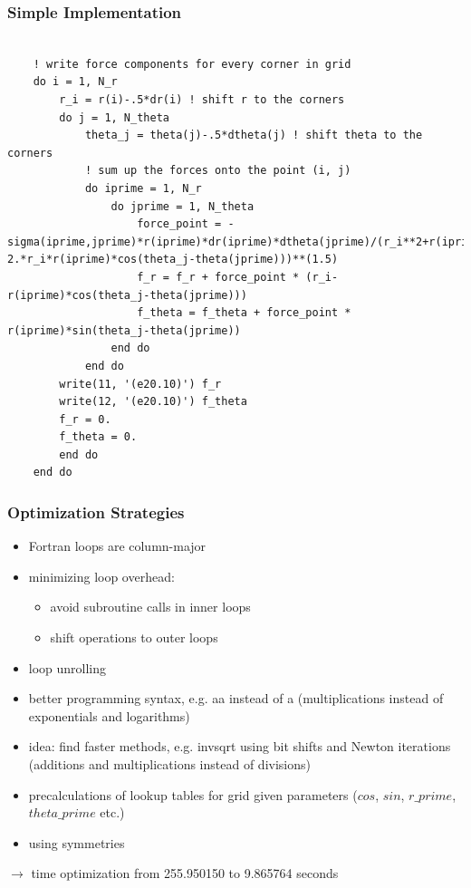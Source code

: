 \documentclass{beamer}
\begin{document}
\begin{frame}[fragile]
  \frametitle{Simple Implementation}
      
  \begin{lstlisting}
  
    ! write force components for every corner in grid
    do i = 1, N_r
        r_i = r(i)-.5*dr(i) ! shift r to the corners
        do j = 1, N_theta
            theta_j = theta(j)-.5*dtheta(j) ! shift theta to the corners
            ! sum up the forces onto the point (i, j)
            do iprime = 1, N_r
                do jprime = 1, N_theta
                    force_point = -sigma(iprime,jprime)*r(iprime)*dr(iprime)*dtheta(jprime)/(r_i**2+r(iprime)**2-2.*r_i*r(iprime)*cos(theta_j-theta(jprime)))**(1.5)
                    f_r = f_r + force_point * (r_i-r(iprime)*cos(theta_j-theta(jprime)))
                    f_theta = f_theta + force_point * r(iprime)*sin(theta_j-theta(jprime))
                end do
            end do
        write(11, '(e20.10)') f_r
        write(12, '(e20.10)') f_theta
        f_r = 0.
        f_theta = 0.
        end do
    end do
  \end{lstlisting}
\end{frame}
\begin{frame}
 \frametitle{Optimization Strategies}
 \begin{itemize}
  \item Fortran loops are column-major
  \item minimizing loop overhead:
  \begin{itemize}
   \item avoid subroutine calls in inner loops
   \item shift operations to outer loops
  \end{itemize}
  \item loop unrolling
  \item better programming syntax, e.g. a\textasteriskcentered a instead of a\textasteriskcentered{} (multiplications instead of exponentials and logarithms)
  \item idea: find faster methods, e.g. invsqrt using bit shifts and Newton iterations (additions and multiplications instead of divisions)
  \item precalculations of lookup tables for grid given parameters ($cos$, $sin$, $r\_prime$, $theta\_prime$ etc.)
  \item using symmetries
 \end{itemize}
 \quad $\longrightarrow$ time optimization from 255.950150 to 9.865764 seconds
\end{frame}
\end{document}
